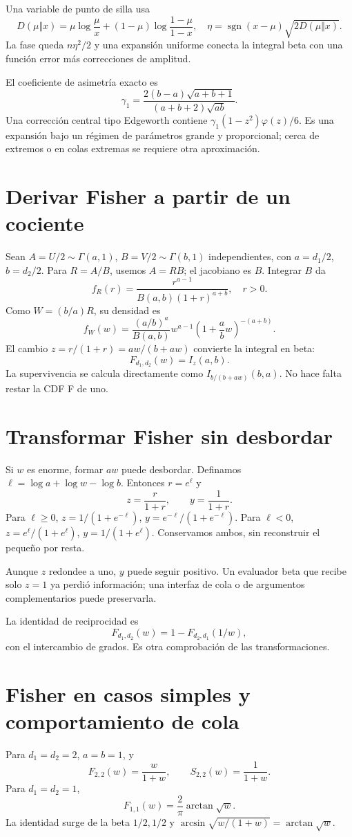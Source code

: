 \documentclass[11pt,a4paper]{article}
\theoremstyle{definition}
\DeclareMathOperator{\sgn}{sgn}
\newcommand{\ph}{\varphi}
\begin{document}
Una variable de punto de silla usa
\[
D(\mu\Vert x)=\mu\log\frac\mu x+
(1-\mu)\log\frac{1-\mu}{1-x},
\quad \eta=\sgn(x-\mu)\sqrt{2D(\mu\Vert x)}.
\]
La fase queda $n\eta^2/2$ y una expansión uniforme conecta la integral beta con una función error más correcciones de amplitud.

El coeficiente de asimetría exacto es
\[
\gamma_1=\frac{2(b-a)\sqrt{a+b+1}}
{(a+b+2)\sqrt{ab}}.
\]
Una corrección central tipo Edgeworth contiene
$\gamma_1(1-z^2)\ph(z)/6$. Es una expansión bajo un régimen de parámetros grande y proporcional; cerca de extremos o en colas extremas se requiere otra aproximación.

\section{Derivar Fisher a partir de un cociente}
Sean $A=U/2\sim\Gamma(a,1)$, $B=V/2\sim\Gamma(b,1)$ independientes, con $a=d_1/2$, $b=d_2/2$. Para $R=A/B$, usemos $A=RB$; el jacobiano es $B$. Integrar $B$ da
\[
f_R(r)=\frac{r^{a-1}}{B(a,b)(1+r)^{a+b}},\quad r>0.
\]
Como $W=(b/a)R$, su densidad es
\[
f_W(w)=\frac{(a/b)^a}{B(a,b)}
w^{a-1}\left(1+\frac abw\right)^{-(a+b)}.
\]
El cambio $z=r/(1+r)=aw/(b+aw)$ convierte la integral en beta:
\[
F_{d_1,d_2}(w)=I_z(a,b).
\]
La supervivencia se calcula directamente como
$I_{b/(b+aw)}(b,a)$. No hace falta restar la CDF F de uno.

\section{Transformar Fisher sin desbordar}
Si $w$ es enorme, formar $aw$ puede desbordar. Definamos
$\ell=\log a+\log w-\log b$. Entonces $r=e^\ell$ y
\[
z=\frac r{1+r},\qquad y=\frac1{1+r}.
\]
Para $\ell\ge0$,
$z=1/(1+e^{-\ell})$, $y=e^{-\ell}/(1+e^{-\ell})$.
Para $\ell<0$,
$z=e^\ell/(1+e^\ell)$, $y=1/(1+e^\ell)$.
Conservamos ambos, sin reconstruir el pequeño por resta.

Aunque $z$ redondee a uno, $y$ puede seguir positivo. Un evaluador beta que recibe solo $z=1$ ya perdió información; una interfaz de cola o de argumentos complementarios puede preservarla.

La identidad de reciprocidad es
\[
F_{d_1,d_2}(w)=1-F_{d_2,d_1}(1/w),
\]
con el intercambio de grados. Es otra comprobación de las transformaciones.

\section{Fisher en casos simples y comportamiento de cola}
Para $d_1=d_2=2$, $a=b=1$, y
\[
F_{2,2}(w)=\frac w{1+w},\qquad S_{2,2}(w)=\frac1{1+w}.
\]
Para $d_1=d_2=1$,
\[
F_{1,1}(w)=\frac2\pi\arctan\sqrt w.
\]
La identidad surge de la beta $1/2,1/2$ y
$\arcsin\sqrt{w/(1+w)}=\arctan\sqrt w$.
\end{document}
